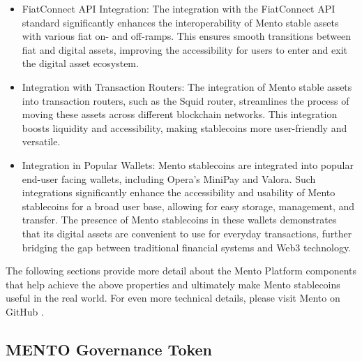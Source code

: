 \documentclass[a4paper]{article}
\theoremstyle{definition}
\begin{document}
\begin{itemize}
    \item FiatConnect API Integration: The integration with the FiatConnect API standard significantly enhances the interoperability of Mento stable assets with various fiat on- and off-ramps. This ensures smooth transitions between fiat and digital assets, improving the accessibility for users to enter and exit the digital asset ecosystem.
    
    \item Integration with Transaction Routers: The integration of Mento stable assets into transaction routers, such as the Squid router, streamlines the process of moving these assets across different blockchain networks. This integration boosts liquidity and accessibility, making stablecoins more user-friendly and versatile.
    
    \item Integration in Popular Wallets: Mento stablecoins are integrated into popular end-user facing wallets, including Opera's MiniPay and Valora. Such integrations significantly enhance the accessibility and usability of Mento stablecoins for a broad user base, allowing for easy storage, management, and transfer. The presence of Mento stablecoins in these wallets demonstrates that its digital assets are convenient to use for everyday transactions, further bridging the gap between traditional financial systems and Web3 technology.
\end{itemize}

The following sections provide more detail about the Mento Platform components that help achieve the above properties and ultimately make Mento stablecoins useful in the real world. For even more technical details, please visit Mento on GitHub \cite{mento_github}.

\subsection{ MENTO Governance Token}\label{sec:gov_token}
\end{document}
